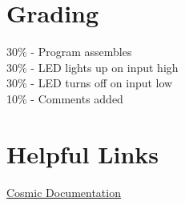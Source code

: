 \documentclass[
	12pt, %
]{fphw}
\begin{document}

\section*{Grading}

30\% - Program assembles\\
30\% - LED lights up on input high\\
30\% - LED turns off on input low\\
10\% - Comments added\\




\section*{Helpful Links}
\href{https://github.com/clbx/Cosmic/tree/master/doc}{Cosmic Documentation}\\

\end{document}
